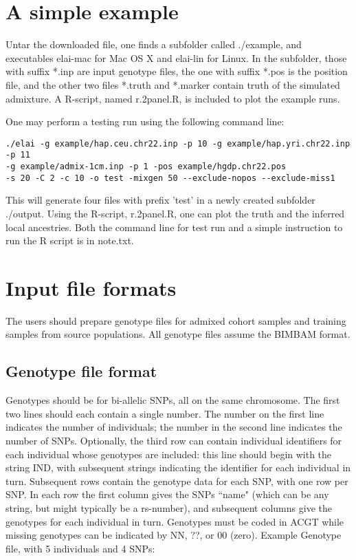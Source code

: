 \documentclass[11pt,Palatino]{article}
\begin{document}
\section{A simple example}
Untar the downloaded file, one finds a subfolder called ./example, and executables elai-mac for Mac OS X and elai-lin for Linux.   
In the subfolder, those with suffix *.inp are input genotype files, the one with suffix *.pos is the position file, and the other two files *.truth and *.marker contain truth of the simulated admixture. 
A R-script, named r.2panel.R, is included to plot the example runs.  

One may perform a testing run using the following command line: 
\begin{verbatim}
./elai -g example/hap.ceu.chr22.inp -p 10 -g example/hap.yri.chr22.inp -p 11 
-g example/admix-1cm.inp -p 1 -pos example/hgdp.chr22.pos 
-s 20 -C 2 -c 10 -o test -mixgen 50 --exclude-nopos --exclude-miss1
\end{verbatim}
This will generate four files with prefix 'test' in a newly created subfolder ./output.  Using the R-script, r.2panel.R, one can plot the truth and the inferred local ancestries. Both the command line for test run and a simple instruction to run the R script is in note.txt. 

\section{Input file formats}
The users should prepare genotype files for admixed cohort samples and training samples from source populations.  All genotype files assume the BIMBAM format. 

\subsection{Genotype file format}
Genotypes should be for bi-allelic SNPs, all on the same chromosome. The first two lines should each contain a single number. The number on the first line indicates the number of individuals; the number in the second line indicates the number of SNPs. Optionally, the third row can contain individual identifiers for each individual whose genotypes are included: this line should begin with the string IND, with subsequent strings indicating the identifier for each individual in turn. Subsequent rows contain the genotype data for each SNP, with one row per SNP. In each row the first column gives the SNPs ``name" (which can be any string, but might typically be a rs-number), and subsequent columns give the genotypes for each individual in turn. Genotypes must be coded in ACGT while missing genotypes can be indicated by NN, ??, or 00 (zero).
Example Genotype file, with 5 individuals and 4 SNPs:
\end{document}
